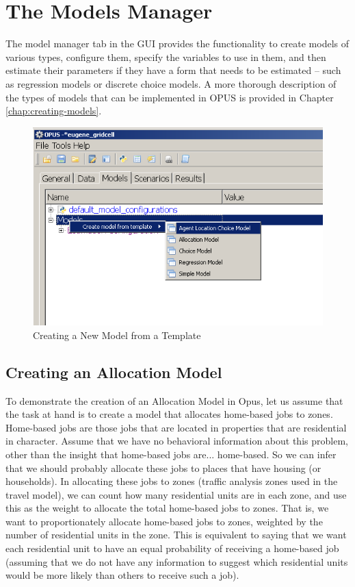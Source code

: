 \chapter{The Models Manager}

The model manager tab in the GUI provides the functionality to create models of various types, configure them, specify the variables to use in them, and then estimate their parameters if they have a form that needs to be estimated -- such as regression models or discrete choice models.  A more thorough description of the types of models that can be implemented in OPUS is provided in Chapter \ref{chap:creating-models}.

\begin{figure}[htp]
\begin{center}
\includegraphics[scale=0.6]{part-gui/images/model-manager-create-model-from-template.png}
\end{center}
\caption{Creating a New Model from a Template}
\label{fig:create-model}
\end{figure}

\section{Creating an Allocation Model}

To demonstrate the creation of an Allocation Model in Opus, let us assume that the task at hand is to create a model that allocates home-based jobs to zones.  Home-based jobs are those jobs that are located in properties that are residential in character.  Assume that we have no behavioral information about this problem, other than the insight that home-based jobs are... home-based.  So we can infer that we should probably allocate these jobs to places that have housing (or households).  In allocating these jobs to zones (traffic analysis zones used in the travel model), we can count how many residential units are in each zone, and use this as the weight to allocate the total home-based jobs to zones.  That is, we want to proportionately allocate home-based jobs to zones, weighted by the number of residential units in the zone.  This is equivalent to saying that we want each residential unit to have an equal probability of receiving a home-based job (assuming that we do not have any information to suggest which residential units would be more likely than others to receive such a job).


